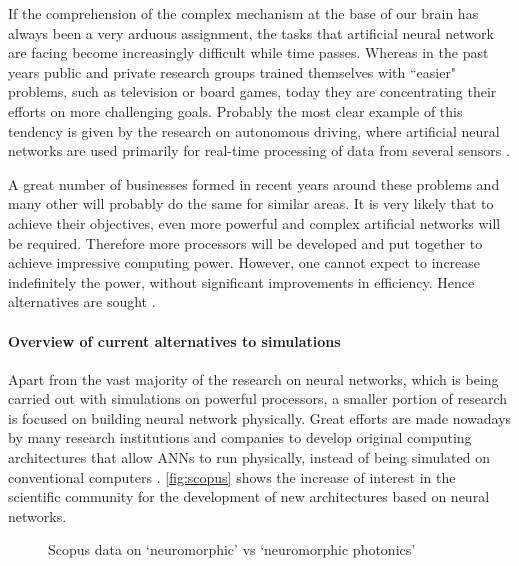 If the comprehension of the complex mechanism at the base of our brain has always been a very arduous assignment, the tasks that artificial neural network are facing become increasingly difficult while time passes.
Whereas in the past years public and private research groups trained themselves with ``easier" problems, such as television or board games, today they are concentrating their efforts on more challenging goals.
Probably the most clear example of this tendency is given by the research on autonomous driving, where artificial neural networks are used primarily for real-time processing of data from several sensors \cite{roadDetection}.

A great number of businesses formed in recent years around these problems and many other will probably do the same for similar areas.
It is very likely that to achieve their objectives, even more powerful and complex artificial networks will be required.
Therefore more processors will be developed and put together to achieve impressive computing power.
However, one cannot expect to increase indefinitely the power, without significant improvements in efficiency.
Hence alternatives are sought \cite{soman2016recent}.

\paragraph{Overview of current alternatives to simulations\\}
Apart from the vast majority of the research on neural networks, which is being carried out with simulations on powerful processors, a smaller portion of research is focused on building neural network physically.
Great efforts are made nowadays by many research institutions and companies to develop original computing architectures that allow \acp{ANN} to run physically, instead of being simulated on conventional computers \cite{soman2016recent}.
\autoref{fig:scopus} shows the increase of interest in the scientific community for the development of new architectures based on neural networks.

\begin{figure}[htbp]
	\centering
	
	\caption{Scopus data on `neuromorphic' vs `neuromorphic photonics'}
	\label{fig:scopus}
\end{figure}

